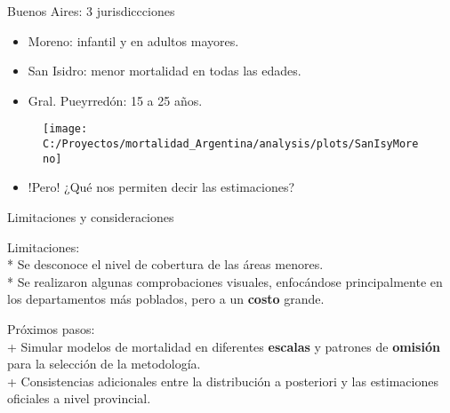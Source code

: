 \documentclass[10pt,ignorenonframetext,]{beamer}
\providecommand{\tightlist}{%
  \setlength{\itemsep}{0pt}\setlength{\parskip}{0pt}}
\begin{document}
\begin{frame}{Buenos Aires: 3 jurisdiccciones}

\begin{itemize}[<+->]
\tightlist
\item
  Moreno: infantil y en adultos mayores.\\
\item
  San Isidro: menor mortalidad en todas las edades.\\
\item
  Gral. Pueyrredón: 15 a 25 años.
\end{itemize}

\begin{figure}

{\centering \texttt{[image: C:/Proyectos/mortalidad\_Argentina/analysis/plots/SanIsyMoreno]} 

}

\end{figure}

\end{frame}

\begin{frame}

\begin{itemize}[<+->]
\tightlist
\item
  !Pero! ¿Qué nos permiten decir las estimaciones?
\end{itemize}

\end{frame}

\begin{frame}{Limitaciones y consideraciones}

Limitaciones:\\
* Se desconoce el nivel de cobertura de las áreas menores.\\
* Se realizaron algunas comprobaciones visuales, enfocándose
principalmente en los departamentos más poblados, pero a un
\textbf{costo} grande.

Próximos pasos:\\
+ Simular modelos de mortalidad en diferentes \textbf{escalas} y
patrones de \textbf{omisión} para la selección de la metodología.\\
+ Consistencias adicionales entre la distribución a posteriori y las
estimaciones oficiales a nivel provincial.

\end{frame}
\end{document}
